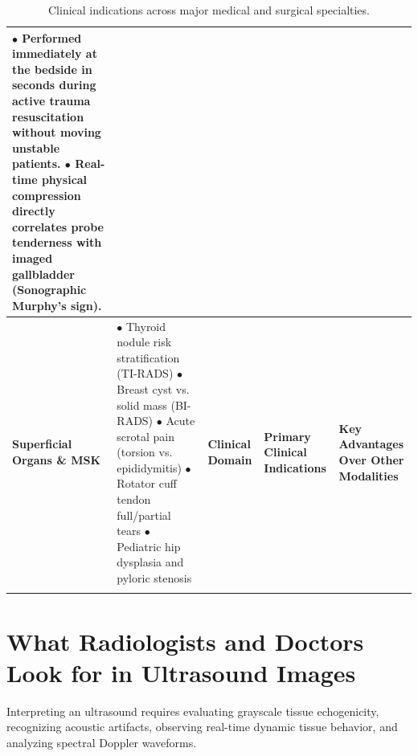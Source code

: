 \documentclass[11pt,a4paper]{article}
\begin{document}
\begin{longtable}{p{3.2cm}p{6cm}p{6cm}}
$\bullet$ Performed immediately at the bedside in seconds during active trauma resuscitation without moving unstable patients.\newline
$\bullet$ Real-time physical compression directly correlates probe tenderness with imaged gallbladder (Sonographic Murphy's sign). \\
\midrule
\textbf{Superficial Organs \& MSK} & 
$\bullet$ Thyroid nodule risk stratification (TI-RADS)\newline
$\bullet$ Breast cyst vs. solid mass (BI-RADS)\newline
$\bullet$ Acute scrotal pain (torsion vs. epididymitis)\newline
$\bullet$ Rotator cuff tendon full/partial tears\newline
$\bullet$ Pediatric hip dysplasia and pyloric stenosis & 
\textbf{Clinical Domain} & \textbf{Primary Clinical Indications} & \textbf{Key Advantages Over Other Modalities} \\
\bottomrule
\caption{Clinical indications across major medical and surgical specialties.}
\label{tab:clinical_indications}
\end{longtable}

\section{What Radiologists and Doctors Look for in Ultrasound Images}

Interpreting an ultrasound requires evaluating grayscale tissue echogenicity, recognizing acoustic artifacts, observing real-time dynamic tissue behavior, and analyzing spectral Doppler waveforms.
\end{document}
